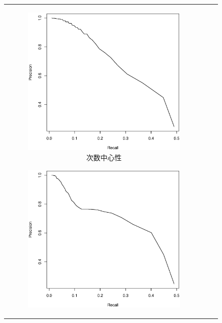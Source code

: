 \documentclass{jsarticle}
\begin{document}
\begin{figure}[h]
    \centering
    \begin{tabular}{ccc}
        \begin{subfigure}[h]{.33\linewidth}
            \includegraphics[width=\linewidth]{img/prcurve_d.eps}
            \caption{次数中心性}
        \end{subfigure}
        \begin{subfigure}[h]{.33\linewidth}
            \includegraphics[width=\linewidth]{img/prcurve_e.eps}

\end{subfigure}
\end{tabular}
\end{figure}
\end{document}
